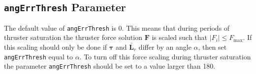 \documentclass[]{BasiliskReportMemo}
\begin{document}
\subsection{{\tt angErrThresh} Parameter}
The default value of {\tt angErrThresh} is 0\dg.  This means that during periods of thruster saturation the thruster force solution $\bm F$ is scaled such that $|F_{i}| \le F_{\text{max}}$.  If this scaling should only be done if $\bm\tau$ and $\bar{\bm L}_{r}$ differ by an angle $\alpha$, then set {\tt angErrThresh} equal to $\alpha$.  To turn off this force scaling during thruster saturation the parameter   {\tt angErrThresh} should be set to a value larger than 180\dg.  




\end{document}
